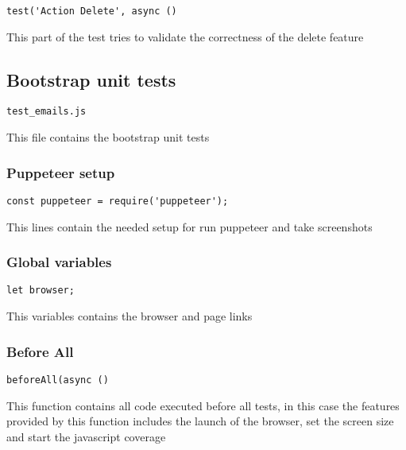 \documentclass[a4paper]{article}
\begin{document}
\begin{lstlisting}
test('Action Delete', async ()
\end{lstlisting}

This part of the test tries to validate the correctness of the delete feature

\hypertarget{toc129}{}
\subsection{Bootstrap unit tests}

\begin{lstlisting}
test_emails.js
\end{lstlisting}

This file contains the bootstrap unit tests

\hypertarget{toc130}{}
\subsubsection{Puppeteer setup}

\begin{lstlisting}
const puppeteer = require('puppeteer');
\end{lstlisting}

This lines contain the needed setup for run puppeteer and take screenshots

\hypertarget{toc131}{}
\subsubsection{Global variables}

\begin{lstlisting}
let browser;
\end{lstlisting}

This variables contains the browser and page links

\hypertarget{toc132}{}
\subsubsection{Before All}

\begin{lstlisting}
beforeAll(async ()
\end{lstlisting}

This function contains all code executed before all tests, in this case the
features provided by this function includes the launch of the browser, set
the screen size and start the javascript coverage

\hypertarget{toc133}{}
\end{document}
